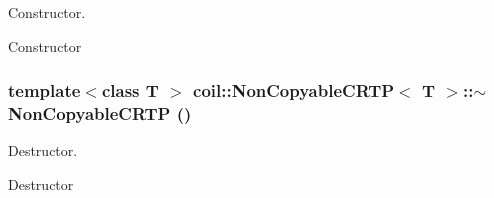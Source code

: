 Constructor. 

Constructor 
\subsubsection[{$\sim$NonCopyableCRTP}]{\setlength{\rightskip}{0pt plus 5cm}template$<$class T $>$ {\bf coil::NonCopyableCRTP}$<$ T $>$::$\sim${\bf NonCopyableCRTP} ()\hspace{0.3cm}{\ttfamily  [inline, protected]}}\label{classcoil_1_1NonCopyableCRTP_abf9fdd83a0a9a7d3ea13268ba12c41c6}


Destructor. 

Destructor 